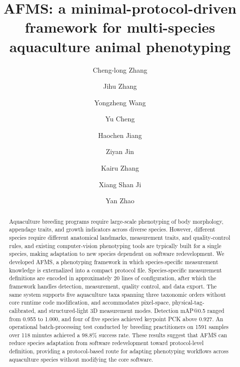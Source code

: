 \documentclass[final,3p,times]{elsarticle}
\begin{document}
\begin{frontmatter}

\title{AFMS: a minimal-protocol-driven framework for multi-species aquaculture animal phenotyping}

\author[label1,label2]{Cheng-long Zhang\corref{+}}
\author[label1,label2]{Jihu Zhang\corref{+}}
\author[label1,label2]{Yongzheng Wang}
\author[label1,label2]{Yu Cheng}
\author[label1,label2]{Haochen Jiang}
\author[label1,label2]{Ziyan Jin}
\author[label1,label2]{Kairu Zhang}
\author[label1,label2]{Xiang Shan Ji\corref{*}}
\author[label1,label2]{Yan Zhao\corref{*}}





\begin{abstract}
Aquaculture breeding programs require large-scale phenotyping of body morphology, appendage traits, and growth indicators across diverse species. However, different species require different anatomical landmarks, measurement traits, and quality-control rules, and existing computer-vision phenotyping tools are typically built for a single species, making adaptation to new species dependent on software redevelopment. We developed AFMS, a phenotyping framework in which species-specific measurement knowledge is externalized into a compact protocol file. Species-specific measurement definitions are encoded in approximately 20 lines of configuration, after which the framework handles detection, measurement, quality control, and data export. The same system supports five aquaculture taxa spanning three taxonomic orders without core runtime code modification, and accommodates pixel-space, physical-tag-calibrated, and structured-light 3D measurement modes. Detection mAP@0.5 ranged from 0.955 to 1.000, and four of five species achieved keypoint PCK above 0.927. An operational batch-processing test conducted by breeding practitioners on 1591 samples over 118 minutes achieved a 98.8\% success rate. These results suggest that AFMS can reduce species adaptation from software redevelopment toward protocol-level definition, providing a protocol-based route for adapting phenotyping workflows across aquaculture species without modifying the core software.
\end{abstract}


\end{frontmatter}
\end{document}
